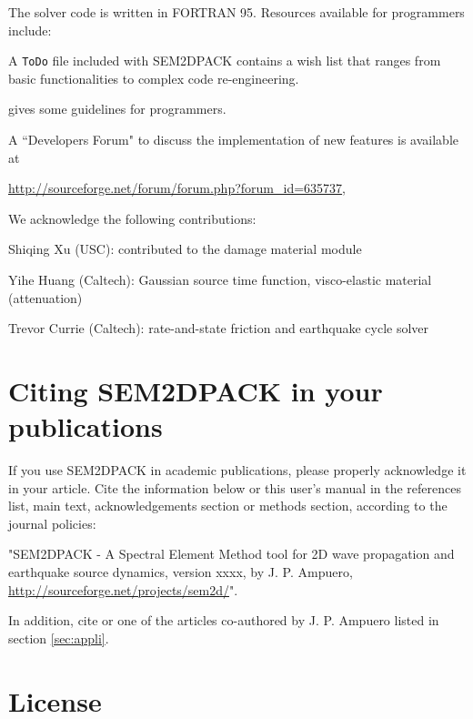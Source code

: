 The solver code is written in FORTRAN 95.
Resources available for programmers include:
\begin{sitemize}
  \item A \texttt{ToDo} file included with SEM2DPACK
contains a wish list that ranges from basic functionalities to complex code re-engineering.
  \item {} gives some guidelines for programmers.
  \item A ``Developers Forum" to discuss the implementation of new features is available at \\
\centerline{\url{http://sourceforge.net/forum/forum.php?forum_id=635737},}
\end{sitemize}

We acknowledge the following contributions:
\begin{sitemize}
  \item Shiqing Xu (USC): contributed to the damage material module
  \item Yihe Huang (Caltech): Gaussian source time function, visco-elastic material (attenuation)
  \item Trevor Currie (Caltech): rate-and-state friction and earthquake cycle solver 
\end{sitemize}

\section{Citing SEM2DPACK in your publications}

If you use SEM2DPACK in academic publications, please properly acknowledge it in your article.
Cite the information below or this user’s manual in the references list, main text, 
acknowledgements section or methods section, according to the journal policies:

"SEM2DPACK - A Spectral Element Method tool for 2D wave propagation and earthquake source dynamics, 
version xxxx, by J. P. Ampuero, \url{http://sourceforge.net/projects/sem2d/}". 

In addition, cite \cite{Amp02} or
one of the articles co-authored by J. P. Ampuero listed in section \ref{sec:appli}.

\section{License}

